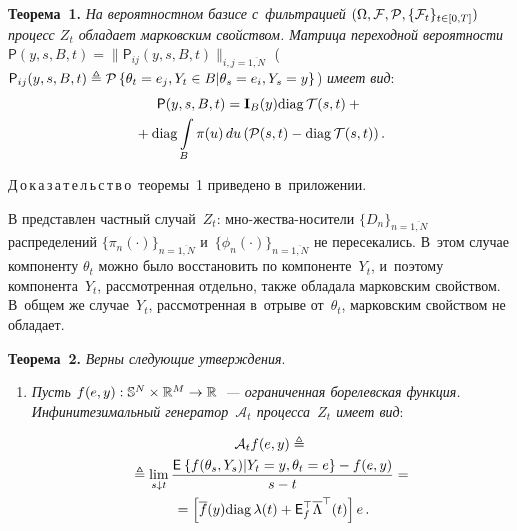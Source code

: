 \begin{multicols}{2}
\smallskip

\noindent
\textbf{Теорема~1.}
\textit{На вероятностном базисе с~фильтрацией $(\Omega,{\mathcal F},{\mathcal P}, \{{\mathcal F}_t\}_{t \in 
[0,T]})$ процесс $Z_t$ обладает марковским свойством.
Матрица переходной вероятности} $\mathsf{P}(y,s,B,t) 
=\|\mathsf{P}_{ij}(y,s,B,t)\|_{i,j=\overline{1,N}}$
($\mathsf{P}_{ij}(y,s,B,t) \hm\ebd \pp{\theta_t = e_j, Y_t \in B | \theta_s = e_i, 
Y_s=y}$)
\textit{имеет вид}:
\begin{multline}
\mathsf{P}(y,s,B,t) = \mathbf{I}_B(y)\mathrm{diag}\,\mathcal{T}(s,t) + {}\\
{}+\mathrm{diag}  \int\limits_B 
\pi(u)\,du \left( {\mathcal P}(s,t) - \mathrm{diag}\,\mathcal{T}(s,t) \right).
\label{eq:eq_trfunc}
\end{multline}

\noindent
Д\,о\,к\,а\,з\,а\,т\,е\,л\,ь\,с\,т\,в\,о\ тео\-ре\-мы~1 приведено в~приложении.

\smallskip

В \cite{B_04_1} представлен частный случай~$Z_t$: мно-\linebreak жест\-ва-но\-си\-те\-ли 
$\{D_n\}_{n=\overline{1,N}}$ распределений $\{\pi_n(\cdot)\}_{n=\overline{1,N}}$ 
и~$\{\phi_n(\cdot)\}_{n=\overline{1,N}}$ не пересекались. В~этом случае 
компоненту $\theta_t$ можно было восстановить по компоненте~$Y_t$,
и~поэтому компонента~$Y_t$, рассмотренная отдельно, также обладала марковским 
свойством. В~общем же случае~$Y_t$, рассмотренная в~отрыве от~$\theta_t$, 
марковским свойством не обладает.


\smallskip

\noindent
\textbf{Теорема~2.}
\textit{Верны следующие утверждения}.
\begin{enumerate}[1.]
\item \textit{Пусть $f(e,y): \mathbb{S}^N \times  \mathbb{R}^M \hm\to \mathbb{R}$~--- 
ограниченная борелевская функция.
Инфинитезимальный генератор~$\mathcal{A}_t$ процесса~$Z_t$ имеет вид}:

\vspace*{-4pt}

\noindent
\begin{multline*}
\mathcal{A}_t f(e,y) \triangleq{}\\
{}\triangleq
\lim\limits_{s \downarrow t}\displaystyle\frac{\displaystyle \mathsf{E}_{  }\left\{ \mathop{f( \theta_s,Y_s)|Y_t = y, \theta_t = e} \right\} - 
f(e,y)\mathstrut}{\displaystyle s - t\mathstrut} ={}\\
{}=
\left[\overline{f}(y) \mathrm{diag}\,\lambda(t) + {\mathsf E}_f^{\top} \overline{\Lambda}^{\top}(t)\right]e\,.
\end{multline*}


\end{enumerate}
\end{multicols}
